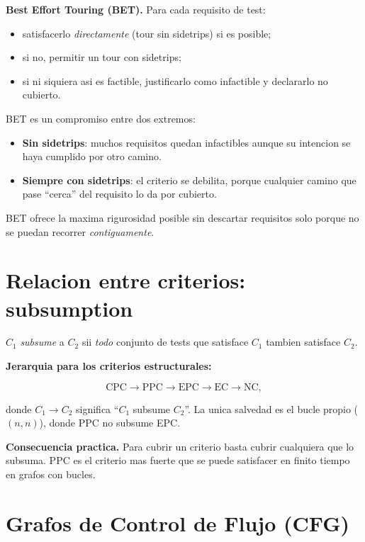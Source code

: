 \documentclass[12pt,a4paper]{article}
\begin{document}
\begin{ideabox}
\textbf{Best Effort Touring (BET).} Para cada requisito de test:
\begin{itemize}
  \item satisfacerlo \emph{directamente} (tour sin sidetrips) si es posible;
  \item si no, permitir un tour con sidetrips;
  \item si ni siquiera asi es factible, justificarlo como infactible y declararlo no cubierto.
\end{itemize}
\end{ideabox}

BET es un compromiso entre dos extremos:
\begin{itemize}
  \item \textbf{Sin sidetrips}: muchos requisitos quedan infactibles aunque su intencion se haya
  cumplido por otro camino.
  \item \textbf{Siempre con sidetrips}: el criterio se debilita, porque cualquier camino que pase
  ``cerca'' del requisito lo da por cubierto.
\end{itemize}

BET ofrece la maxima rigurosidad posible sin descartar requisitos solo porque no se puedan
recorrer \emph{contiguamente}.

\section{Relacion entre criterios: subsumption}

\begin{definicionbox}
$C_1$ \emph{subsume} a $C_2$ sii \emph{todo} conjunto de tests que satisface $C_1$ tambien
satisface $C_2$.
\end{definicionbox}

\textbf{Jerarquia para los criterios estructurales:}

\[
\text{CPC} \to \text{PPC} \to \text{EPC} \to \text{EC} \to \text{NC},
\]

donde $C_1 \to C_2$ significa ``$C_1$ subsume $C_2$''. La unica salvedad es el bucle propio
($(n,n)$), donde PPC no subsume EPC.

\textbf{Consecuencia practica.} Para cubrir un criterio basta cubrir cualquiera que lo subsuma.
PPC es el criterio mas fuerte que se puede satisfacer en finito tiempo en grafos con bucles.

\section{Grafos de Control de Flujo (CFG)}
\end{document}
